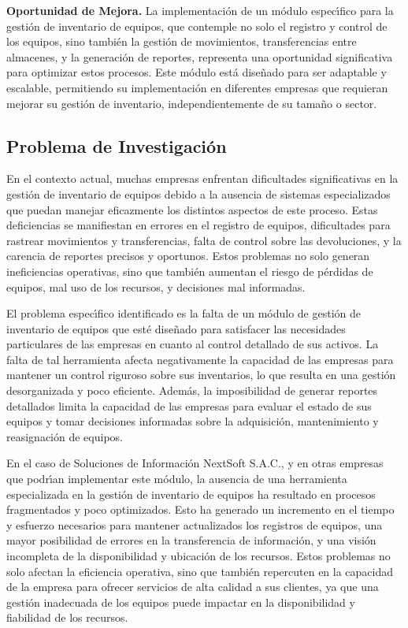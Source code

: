 \documentclass[stu, 12pt, letterpaper, donotrepeattitle, floatsintext, natbib]{apa7}
\begin{document}
\textbf{Oportunidad de Mejora. }La implementaci\'on de un m\'odulo espec\'{\i}fico para la gesti\'on de inventario de equipos, que contemple no solo el registro y control de los equipos, sino tambi\'en la gesti\'on de
movimientos, transferencias entre almacenes, y la generaci\'on de reportes, representa una oportunidad significativa para optimizar estos procesos. Este m\'odulo est\'a dise\~{n}ado para ser adaptable y escalable, permitiendo
su implementaci\'on en diferentes empresas que requieran mejorar su gesti\'on de inventario, independientemente de su tama\~{n}o o sector.

\subsection{Problema de Investigaci\'on}
En el contexto actual, muchas empresas enfrentan dificultades significativas en la gesti\'on de inventario de equipos debido a la ausencia de sistemas especializados que puedan manejar eficazmente los distintos aspectos
de este proceso. Estas deficiencias se manifiestan en errores en el registro de equipos, dificultades para rastrear movimientos y transferencias, falta de control sobre las devoluciones, y la carencia de reportes precisos
y oportunos. Estos problemas no solo generan ineficiencias operativas, sino que tambi\'en aumentan el riesgo de p\'erdidas de equipos, mal uso de los recursos, y decisiones mal informadas.

El problema espec\'{\i}fico identificado es la falta de un m\'odulo de gesti\'on de inventario de equipos que est\'e dise\~{n}ado para satisfacer las necesidades particulares de las empresas en cuanto al control detallado
de sus activos. La falta de tal herramienta afecta negativamente la capacidad de las empresas para mantener un control riguroso sobre sus inventarios, lo que resulta en una gesti\'on desorganizada y poco eficiente. Adem\'as,
la imposibilidad de generar reportes detallados limita la capacidad de las empresas para evaluar el estado de sus equipos y tomar decisiones informadas sobre la adquisici\'on, mantenimiento y reasignaci\'on de equipos.

En el caso de Soluciones de Informaci\'on NextSoft S.A.C., y en otras empresas que podr\'{\i}an implementar este m\'odulo, la ausencia de una herramienta especializada en la gesti\'on de inventario de equipos ha resultado
en procesos fragmentados y poco optimizados. Esto ha generado un incremento en el tiempo y esfuerzo necesarios para mantener actualizados los registros de equipos, una mayor posibilidad de errores en la transferencia de
informaci\'on, y una visi\'on incompleta de la disponibilidad y ubicaci\'on de los recursos. Estos problemas no solo afectan la eficiencia operativa, sino que tambi\'en repercuten en la capacidad de la empresa para ofrecer
servicios de alta calidad a sus clientes, ya que una gesti\'on inadecuada de los equipos puede impactar en la disponibilidad y fiabilidad de los recursos.
\end{document}
